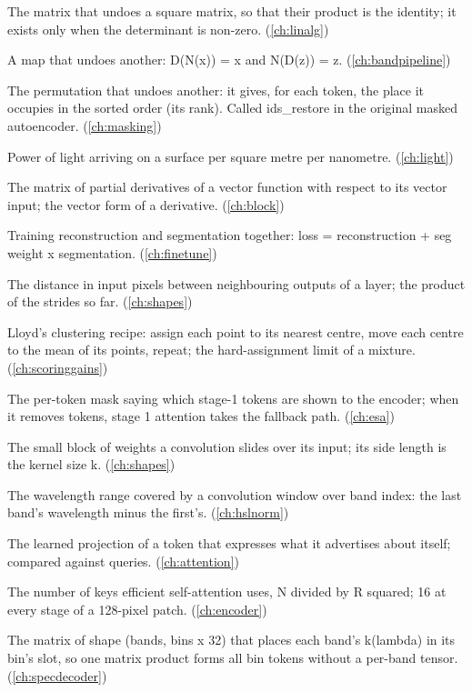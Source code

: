 \begin{description}[style=nextline,leftmargin=1.2em,font=\normalfont\bfseries]
\item[Inverse] The matrix that undoes a square matrix, so that their product is the identity; it exists only when the determinant is non-zero. (\cref{ch:linalg})
\item[Inverse map] A map that undoes another: D(N(x)) = x and N(D(z)) = z. (\cref{ch:bandpipeline})
\item[Inverse permutation] The permutation that undoes another: it gives, for each token, the place it occupies in the sorted order (its rank). Called ids\_restore in the original masked autoencoder. (\cref{ch:masking})
\item[Irradiance] Power of light arriving on a surface per square metre per nanometre. (\cref{ch:light})
\item[Jacobian] The matrix of partial derivatives of a vector function with respect to its vector input; the vector form of a derivative. (\cref{ch:block})
\item[Joint stage] Training reconstruction and segmentation together: loss = reconstruction + seg weight x segmentation. (\cref{ch:finetune})
\item[Jump] The distance in input pixels between neighbouring outputs of a layer; the product of the strides so far. (\cref{ch:shapes})
\item[k-means] Lloyd's clustering recipe: assign each point to its nearest centre, move each centre to the mean of its points, repeat; the hard-assignment limit of a mixture. (\cref{ch:scoringgains})
\item[Keep mask] The per-token mask saying which stage-1 tokens are shown to the encoder; when it removes tokens, stage 1 attention takes the fallback path. (\cref{ch:esa})
\item[Kernel] The small block of weights a convolution slides over its input; its side length is the kernel size k. (\cref{ch:shapes})
\item[Kernel span] The wavelength range covered by a convolution window over band index: the last band's wavelength minus the first's. (\cref{ch:hslnorm})
\item[Key] The learned projection of a token that expresses what it advertises about itself; compared against queries. (\cref{ch:attention})
\item[Key count] The number of keys efficient self-attention uses, N divided by R squared; 16 at every stage of a 128-pixel patch. (\cref{ch:encoder})
\item[kmat] The matrix of shape (bands, bins x 32) that places each band's k(lambda) in its bin's slot, so one matrix product forms all bin tokens without a per-band tensor. (\cref{ch:specdecoder})

\end{description}
